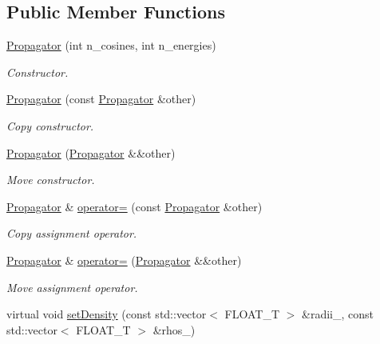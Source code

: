 \subsection*{Public Member Functions}
\begin{DoxyCompactItemize}
\item 
\hyperlink{classcudaprob3_1_1Propagator_a460c3f4476cf5d300bdc94574ae175c6}{Propagator} (int n\+\_\+cosines, int n\+\_\+energies)
\begin{DoxyCompactList}\small\item\em Constructor. \end{DoxyCompactList}\item 
\hyperlink{classcudaprob3_1_1Propagator_a22e248af597b6826b49e7ef42057d321}{Propagator} (const \hyperlink{classcudaprob3_1_1Propagator}{Propagator} \&other)
\begin{DoxyCompactList}\small\item\em Copy constructor. \end{DoxyCompactList}\item 
\hyperlink{classcudaprob3_1_1Propagator_a226e189d52e68341b0238d8f50ea7392}{Propagator} (\hyperlink{classcudaprob3_1_1Propagator}{Propagator} \&\&other)
\begin{DoxyCompactList}\small\item\em Move constructor. \end{DoxyCompactList}\item 
\hyperlink{classcudaprob3_1_1Propagator}{Propagator} \& \hyperlink{classcudaprob3_1_1Propagator_aeb44cd674bf25ed8954b6e2d1ff836dc}{operator=} (const \hyperlink{classcudaprob3_1_1Propagator}{Propagator} \&other)
\begin{DoxyCompactList}\small\item\em Copy assignment operator. \end{DoxyCompactList}\item 
\hyperlink{classcudaprob3_1_1Propagator}{Propagator} \& \hyperlink{classcudaprob3_1_1Propagator_a2ca4bda20f63fb8c96b10f2511b8c5f4}{operator=} (\hyperlink{classcudaprob3_1_1Propagator}{Propagator} \&\&other)
\begin{DoxyCompactList}\small\item\em Move assignment operator. \end{DoxyCompactList}\item 
virtual void \hyperlink{classcudaprob3_1_1Propagator_a119a29681c30c9476f0b50ed07cb639d}{set\+Density} (const std\+::vector$<$ F\+L\+O\+A\+T\+\_\+T $>$ \&radii\+\_\+, const std\+::vector$<$ F\+L\+O\+A\+T\+\_\+T $>$ \&rhos\+\_\+)

\end{DoxyCompactItemize}
